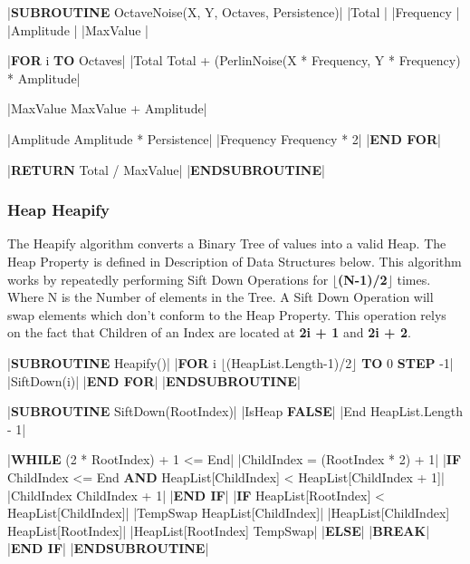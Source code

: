 \begin{flushleft}
                \vspace{0.2cm}
                \begin{pseudocode}
|\textbf{SUBROUTINE} OctaveNoise(X, Y, Octaves, Persistence)|
    |Total |
    |Frequency |
    |Amplitude |
    |MaxValue |

    |\textbf{FOR} i  \textbf{TO} Octaves|
        |Total \leftarrow Total + (PerlinNoise(X * Frequency, Y * Frequency) * Amplitude|

        |MaxValue \leftarrow MaxValue + Amplitude|

        |Amplitude \leftarrow Amplitude * Persistence|
        |Frequency \leftarrow Frequency * 2|
    |\textbf{END FOR}|

    |\textbf{RETURN} Total / MaxValue|
|\textbf{ENDSUBROUTINE}|            
                \end{pseudocode}

            \subsubsection{Heap Heapify}
                The Heapify algorithm converts a Binary Tree of values into a valid Heap. The Heap Property is defined in Description of Data
                Structures below. This algorithm works by repeatedly performing Sift Down Operations for \textbf{$\lfloor$(N-1)/2$\rfloor$} times.
                Where N is the Number of elements in the Tree. A Sift Down Operation will swap elements which don't conform to the Heap Property.
                This operation relys on the fact that Children of an Index are located at \textbf{2i + 1} and \textbf{2i + 2}.
                \vspace{0.2cm}

                \begin{pseudocode} 
|\textbf{SUBROUTINE} Heapify()|
    |\textbf{FOR} i \leftarrow $\lfloor$(HeapList.Length-1)/2$\rfloor$ \textbf{TO} 0 \textbf{STEP} -1|
        |SiftDown(i)|
    |\textbf{END FOR}|
|\textbf{ENDSUBROUTINE}| 

|\textbf{SUBROUTINE} SiftDown(RootIndex)|
    |IsHeap \leftarrow \textbf{FALSE}|
    |End \leftarrow HeapList.Length - 1|

    |\textbf{WHILE} (2 * RootIndex) + 1 <= End|
        |ChildIndex = (RootIndex * 2) + 1|
        |\textbf{IF} ChildIndex <= End \textbf{AND} HeapList[ChildIndex] < HeapList[ChildIndex + 1]|
            |ChildIndex \leftarrow ChildIndex + 1|
        |\textbf{END IF}|
        |\textbf{IF} HeapList[RootIndex] < HeapList[ChildIndex]|
            |TempSwap \leftarrow HeapList[ChildIndex]|
            |HeapList[ChildIndex] \leftarrow HeapList[RootIndex]|
            |HeapList[RootIndex] \leftarrow TempSwap|
        |\textbf{ELSE}|   
            |\textbf{BREAK}|
        |\textbf{END IF}|
|\textbf{ENDSUBROUTINE}| 
                \end{pseudocode}


\end{flushleft}
